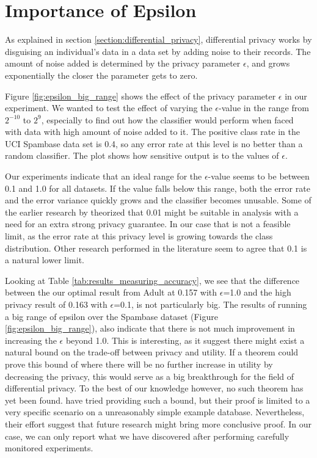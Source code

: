 
\section{Importance of Epsilon}
As explained in section \ref{section:differential_privacy}, differential privacy works by disguising an individual's data in a data set by adding noise to their records. The amount of noise added is determined by the privacy parameter  $\epsilon$, and grows exponentially the closer the parameter gets to zero. 

 
Figure \ref{fig:epsilon_big_range} shows the effect of the privacy parameter $\epsilon$ in our experiment. We wanted to test the effect of varying the $\epsilon$-value in the range from $2^{-10}$ to $2^9$, especially to find out how the classifier would perform when faced with data with high amount of noise added to it. The positive class rate in the UCI Spambase data set is 0.4, so any error rate at this level is no better than a random classifier. The plot shows how sensitive output is to the values of $\epsilon$.

Our experiments indicate that an ideal range for the $\epsilon$-value seems to be between 0.1 and 1.0 for all datasets. If the value falls below this range, both the error rate and the error variance quickly grows and the classifier becomes unusable. Some of the earlier research by \cite{dwork2008differential} theorized that 0.01 might be suitable in analysis with a need for an extra strong privacy guarantee. In our case that is not a feasible limit, as the error rate at this privacy level is growing towards the class distribution. Other research performed in the literature \cite{pathak2010diffprivhomo,kellaris2013groupingSmoothing,hsu2014economicEpsilon} seem to agree that 0.1 is a natural lower limit.   

Looking at Table \ref{tab:results_measuring_accuracy}, we see that the difference between the our optimal result from Adult at 0.157 with $\epsilon$=1.0 and the high privacy result of 0.163 with $\epsilon$=0.1, is not particularly big. The results of running a big range of epsilon over the Spambase dataset (Figure \ref{fig:epsilon_big_range}), also indicate that there is not much improvement in increasing the $\epsilon$ beyond 1.0. This is interesting, as it suggest there might exist a natural bound on the trade-off between privacy and utility. If a theorem could prove this bound of where there will be no further increase in utility by decreasing the privacy, this would serve as a big breakthrough for the field of differential privacy. To the best of our knowledge however, no such theorem has yet been found. \cite{lee2011epsilonBound} have tried providing such a bound, but their proof is limited to a very specific scenario on a unreasonably simple example database. Nevertheless, their effort suggest that future research might bring more conclusive proof. In our case, we can only report what we have discovered after performing carefully monitored experiments.   


